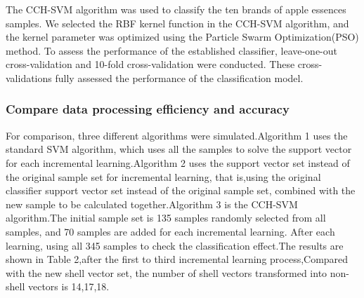\documentclass[a4paper]{article}
\begin{document}
The CCH-SVM algorithm was used to classify the ten brands of apple essences samples. We selected the RBF kernel function in the CCH-SVM algorithm, and the kernel parameter was optimized using the Particle Swarm Optimization(PSO) method. To assess the performance of the established classifier, leave-one-out cross-validation and 10-fold cross-validation were conducted. These cross-validations fully assessed the performance of the classification model.




    \subsubsection{Compare data processing efficiency and accuracy}


For comparison, three different algorithms were simulated.Algorithm 1 uses the standard SVM algorithm, which uses all the samples to solve the support vector for each incremental learning.Algorithm 2 uses the support vector set instead of the original sample set for incremental learning, that is,using the original classifier support vector set instead of the original sample set, combined with the new sample to be calculated together.Algorithm 3 is the CCH-SVM algorithm.The initial sample set is 135 samples randomly selected from all samples, and 70 samples are added for each incremental learning. After each learning, using all 345 samples to check the classification effect.The results are shown in Table 2,after the first to third incremental learning process,Compared with the new shell vector set, the number of shell vectors transformed into non-shell vectors is 14,17,18.
\end{document}
